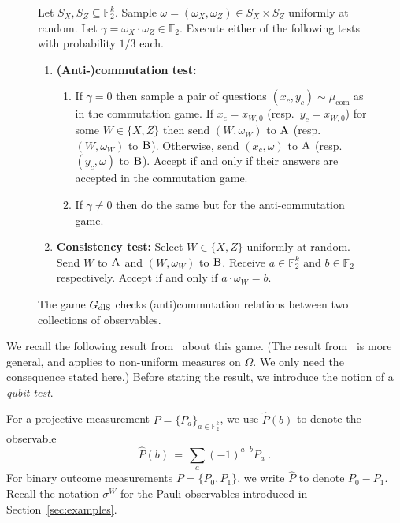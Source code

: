 \documentclass[11pt]{article}
\theoremstyle{definition}
\newcommand{\field}{\mathbb{F}_2}
\newcommand{\dlS}{\ensuremath{\rm dlS}}
\newcommand{\F}{\ensuremath{\mathbb{F}}}
\newcommand{\cc}{\mathrm{com}}
\newcommand{\labelstyle}[1]{\ensuremath{\textsc{#1}}\xspace}
\newcommand{\alice}{\labelstyle{A}}
\newcommand{\bob}{\labelstyle{B}}
\newenvironment{gamespec}{
  \begin{mdframed}[style=figstyle]}{
  \end{mdframed}}
\begin{document}
\begin{figure}[!htbp]
  \centering
  \begin{gamespec}
Let $S_X,S_Z\subseteq \field^k$.  Sample $\omega = (\omega_X,\omega_Z)\in S_X \times S_Z $ uniformly at random. Let $\gamma = \omega_X \cdot \omega_Z \in \field$. Execute either of the following tests with probability $1/3$ each. 
    \begin{enumerate}
      \setlength\itemsep{1pt}
    \item \textbf{(Anti-)commutation test:} 
		\begin{enumerate}
		\item If $\gamma=0$ then sample a pair of questions $(x_c,y_c)\sim\mu_\cc$ as in the commutation game. If $x_c = x_{W,0}$ (resp.\ $y_c=x_{W,0}$) for some $W\in \{X,Z\}$ then send $(W,\omega_W)$ to $\alice$ (resp.\ $(W,\omega_W)$ to $\bob$). Otherwise, send $(x_c,\omega)$ to $\alice$ (resp.\ $(y_c,\omega)$ to $\bob$). Accept if and only if their answers are accepted in the commutation game. 
		\item If $\gamma\neq 0$ then do the same but for the anti-commutation game. 
		\end{enumerate} 
		 \item \textbf{Consistency test:} Select $W\in\{X,Z\}$ uniformly at random. Send $W$ to $\alice$ and $(W,\omega_W)$ to $\bob$. Receive $a\in \field^k$ and $b\in \field$ respectively. Accept if and only if $a\cdot \omega_W=b$. 
    \end{enumerate}
  \end{gamespec}
  \caption{The game $G_{\dlS}$ checks (anti)commutation relations between two collections of observables.}
  \label{fig:dlS}
\end{figure}

We recall the following result from~\cite{de2022spectral} about this game. (The result from~\cite{de2022spectral} is more general, and applies to non-uniform measures on $\Omega$. We only need the consequence stated here.) Before stating the result, we introduce the notion of a \emph{qubit test}. 

For a projective measurement $P = \{P_a\}_{a \in \F_2^k}$, we use $\widehat{P}(b)$ to denote the observable
\[\widehat{P}(b) \,=\, \sum_a (-1)^{a\cdot b} P_a\;.\]
For binary outcome measurements $P = \{ P_0, P_1\}$, we write $\widehat{P}$ to denote $P_0 - P_1$. Recall the notation $\sigma^W$ for the Pauli observables introduced in Section~\ref{sec:examples}.
\end{document}
